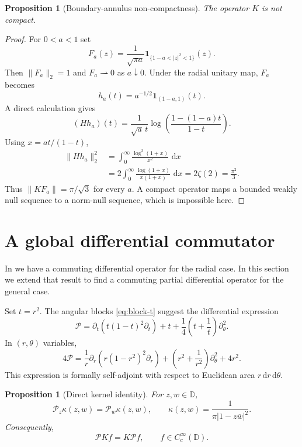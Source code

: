 \IfFileExists{iopjournal.cls}{\documentclass{iopjournal}}{\documentclass{iopjournal-draft}}
\newtheorem{proposition}[theorem]{Proposition}
\theoremstyle{definition}
\theoremstyle{remark}
\newcommand{\D}{\mathbb D}
\newcommand{\dd}{\,\mathrm d}
\newcommand{\norm}[1]{\lVert #1\rVert}
\numberwithin{equation}{section}
\begin{document}
\begin{proposition}[Boundary-annulus non-compactness]
\label{prop:noncompact}
The operator $K$ is not compact.
\end{proposition}

\begin{proof}
For $0<a<1$ set
\begin{equation}
 F_a(z)=\frac1{\sqrt{\pi a}}
 \mathbf1_{\{1-a<|z|^2<1\}}(z).
 \label{eq:annulus-sequence}
\end{equation}
Then $\norm{F_a}_2=1$ and $F_a\rightharpoonup0$ as $a\downarrow0$.  Under the radial unitary map, $F_a$ becomes
\[
 h_a(t)=a^{-1/2}\mathbf1_{(1-a,1)}(t).
\]
A direct calculation gives
\[
 (Hh_a)(t)=\frac1{\sqrt a\,t}
 \log\!\left(\frac{1-(1-a)t}{1-t}\right).
\]
Using $x=at/(1-t)$,
\begin{align*}
 \norm{Hh_a}_2^2
 &=\int_0^\infty\frac{\log^2(1+x)}{x^2}\,\dd x\\
 &=2\int_0^\infty\frac{\log(1+x)}{x(1+x)}\,\dd x
 =2\zeta(2)=\frac{\pi^2}{3}.
\end{align*}
Thus $\norm{KF_a}=\pi/\sqrt3$ for every $a$.  A compact operator maps a bounded weakly null sequence to a norm-null sequence, which is impossible here.
\end{proof}

\section{A global differential commutator}
\label{sec:commutator}

In \cite{Lionheart2026AtLast} we have a commuting differential operator for the radial case. In this section we extend that result to find a commuting partial differential operator for the general case. 

Set $t=r^2$.  The angular blocks \eqref{eq:block-t} suggest the differential expression
\begin{equation}
 \mathcal P
 =\partial_t\!\left(t(1-t)^2\partial_t\right)+t
 +\frac14\left(t+\frac1t\right)\partial_\theta^2.
 \label{eq:P-t}
\end{equation}
In $(r,\theta)$ variables,
\begin{equation}
 4\mathcal P
 =\frac1r\partial_r\!\left(r(1-r^2)^2\partial_r\right)
 +\left(r^2+\frac1{r^2}\right)\partial_\theta^2+4r^2.
 \label{eq:P-r}
\end{equation}
This expression is formally self-adjoint with respect to Euclidean area $r\dd r\dd\theta$.

\begin{proposition}[Direct kernel identity]
\label{prop:kernel-commutator}
For $z,w\in\D$,
\begin{equation}
 \mathcal P_z\kappa(z,w)=\mathcal P_w\kappa(z,w),
 \qquad
 \kappa(z,w)=\frac1{\pi|1-z\overline w|^2}.
 \label{eq:kernel-commutator}
\end{equation}
Consequently,
\begin{equation}
 \mathcal P Kf=K\mathcal P f,
 \qquad f\in C_c^\infty(\D).
 \label{eq:core-commutation}
\end{equation}
\end{proposition}
\end{document}
